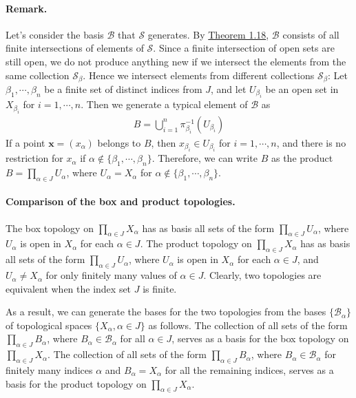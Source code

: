 \documentclass{article}
\numberwithin{equation}{section}
\theoremstyle{plain}
\theoremstyle{definition}
\begin{document}
\paragraph{Remark.} Let's consider the basis $\mathscr{B}$ that $\mathscr{S}$ generates. By \hyperref[thm:1.18]{Theorem 1.18}, $\mathscr{B}$ consists of all finite intersections of elements of $\mathscr{S}$. Since a finite intersection of open sets are still open, we do not produce anything new if we intersect the elements from the same collection $\mathscr{S}_\beta$. Hence we intersect elements from different collections $\mathscr{S}_\beta$: Let $\beta_1,\cdots,\beta_n$ be a finite set of distinct indices from $J$, and let $U_{\beta_i}$ be an open set in $X_{\beta_i}$ for $i=1,\cdots,n$. Then we generate a typical element of $\mathscr{B}$ as
\begin{align*}
	B=\bigcup_{i=1}^n\pi_{\beta_i}^{-1}(U_{\beta_i})
\end{align*}
If a point $\mathbf{x}=(x_\alpha)$ belongs to $B$, then $x_{\beta_i}\in U_{\beta_i}$ for $i=1,\cdots,n$, and there is no restriction for $x_\alpha$ if $\alpha\notin\{\beta_1,\cdots,\beta_n\}$. Therefore, we can write $B$ as the product $B=\prod_{\alpha\in J}U_\alpha$, where $U_\alpha=X_\alpha$ for $\alpha\notin\{\beta_1,\cdots,\beta_n\}$.

\paragraph{Comparison of the box and product topologies.} The box topology on $\prod_{\alpha\in J} X_\alpha$ has as basis all sets of the form $\prod_{\alpha\in J}U_\alpha$, where $U_\alpha$ is open in $X_\alpha$ for each $\alpha\in J$. The product topology on $\prod_{\alpha\in J} X_\alpha$ has as basis all sets of the form $\prod_{\alpha\in J}U_\alpha$, where $U_\alpha$ is open in $X_\alpha$ for each $\alpha\in J$, and $U_\alpha\neq X_\alpha$ for only finitely many values of $\alpha\in J$. Clearly, two topologies are equivalent when the index set $J$ is finite.

As a result, we can generate the bases for the two topologies from the bases $\{\mathscr{B}_\alpha\}$ of topological spaces $\{X_\alpha,\alpha\in J\}$ as follows. The collection of all sets of the form $\prod_{\alpha\in J}B_\alpha$, where $B_\alpha\in\mathscr{B}_\alpha$ for all $\alpha\in J$, serves as a basis for the box topology on $\prod_{\alpha\in J}X_\alpha$. The collection of all sets of the form $\prod_{\alpha\in J}B_\alpha$, where $B_\alpha\in\mathscr{B}_\alpha$ for finitely many indices $\alpha$ and $B_\alpha=X_\alpha$ for all the remaining indices, serves as a basis for the product topology on $\prod_{\alpha\in J}X_\alpha$.
\end{document}
